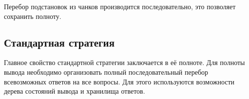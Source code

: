 Перебор подстановок из чанков производится последовательно, это позволяет сохранить полноту.

\subsection{Стандартная стратегия}
Главное свойство стандартной стратегии заключается в её полноте. Для полноты вывода необходимо организовать полный последовательный перебор всевозможных ответов на все вопросы. Для этого используются возможности дерева состояний вывода и хранилища ответов.


